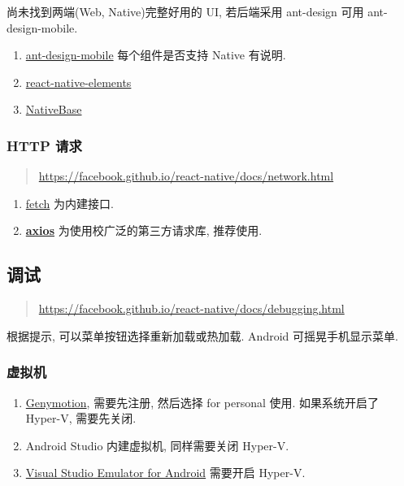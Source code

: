 尚未找到两端(Web, Native)完整好用的 UI, 若后端采用 ant-design 可用
ant-design-mobile.

\begin{enumerate}
\def\labelenumi{\arabic{enumi}.}
\tightlist
\item
  \href{https://github.com/ant-design/ant-design-mobile}{ant-design-mobile}
  每个组件是否支持 Native 有说明.
\item
  \href{https://github.com/react-native-training/react-native-elements}{react-native-elements}
\item
  \href{https://github.com/GeekyAnts/NativeBase}{NativeBase}
\end{enumerate}

\subsubsection{HTTP 请求}\label{http-ux8bf7ux6c42}

\begin{quote}
\url{https://facebook.github.io/react-native/docs/network.html}
\end{quote}

\begin{enumerate}
\def\labelenumi{\arabic{enumi}.}
\tightlist
\item
  \href{https://developer.mozilla.org/en-US/docs/Web/API/Fetch_API}{fetch}
  为内建接口.
\item
  \href{https://github.com/axios/axios}{\textbf{axios}}
  为使用校广泛的第三方请求库, 推荐使用.
\end{enumerate}

\subsection{调试}\label{ux8c03ux8bd5}

\begin{quote}
\url{https://facebook.github.io/react-native/docs/debugging.html}
\end{quote}

根据提示, 可以菜单按钮选择重新加载或热加载. Android 可摇晃手机显示菜单.

\subsubsection{虚拟机}\label{ux865aux62dfux673a}

\begin{enumerate}
\def\labelenumi{\arabic{enumi}.}
\tightlist
\item
  \href{https://www.genymotion.com/download/}{Genymotion}, 需要先注册,
  然后选择 for personal 使用. 如果系统开启了 Hyper-V, 需要先关闭.
\item
  Android Studio 内建虚拟机, 同样需要关闭 Hyper-V.
\item
  \href{https://www.visualstudio.com/vs/msft-android-emulator/}{Visual
  Studio Emulator for Android} 需要开启 Hyper-V.
\end{enumerate}

